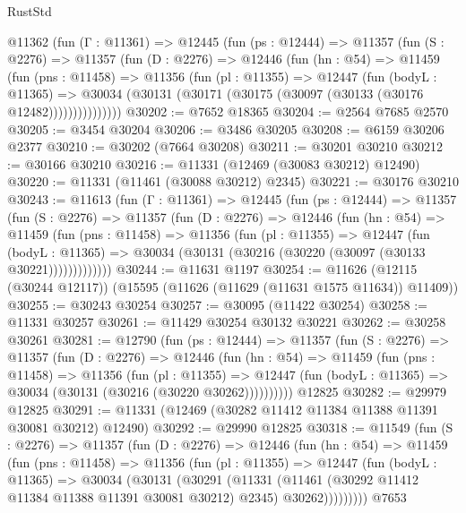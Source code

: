 \begin{lexlean}{RustStd}
\begin{coremodule}
    @11362
      (fun (Γ : @11361) =>
      @12445
        (fun (ps : @12444) =>
        @11357
          (fun (S : @2276) =>
          @11357
            (fun (D : @2276) =>
            @12446
              (fun (hn : @54) =>
              @11459
                (fun (pns : @11458) =>
                @11356
                  (fun (pl : @11355) =>
                  @12447
                    (fun (bodyL : @11365) =>
                    @30034 (@30131 (@30171 (@30175 (@30097 (@30133 (@30176 @12482)))))))))))))))
@30202 := @7652 @18365
@30204 := @2564 @7685 @2570
@30205 := @3454 @30204
@30206 := @3486 @30205
@30208 := @6159 @30206 @2377
@30210 := @30202 (@7664 @30208)
@30211 := @30201 @30210
@30212 := @30166 @30210
@30216 := @11331 (@12469 (@30083 @30212) @12490)
@30220 := @11331 (@11461 (@30088 @30212) @2345)
@30221 := @30176 @30210
@30243 := @11613
    (fun (Γ : @11361) =>
    @12445
      (fun (ps : @12444) =>
      @11357
        (fun (S : @2276) =>
        @11357
          (fun (D : @2276) =>
          @12446
            (fun (hn : @54) =>
            @11459
              (fun (pns : @11458) =>
              @11356
                (fun (pl : @11355) =>
                @12447
                  (fun (bodyL : @11365) =>
                  @30034 (@30131 (@30216 (@30220 (@30097 (@30133 @30221)))))))))))))
@30244 := @11631 @1197
@30254 := @11626 (@12115 (@30244 @12117)) (@15595 (@11626 (@11629 (@11631 @1575 @11634)) @11409))
@30255 := @30243 @30254
@30257 := @30095 (@11422 @30254)
@30258 := @11331 @30257
@30261 := @11429 @30254 @30132 @30221
@30262 := @30258 @30261
@30281 := @12790
    (fun (ps : @12444) =>
    @11357
      (fun (S : @2276) =>
      @11357
        (fun (D : @2276) =>
        @12446
          (fun (hn : @54) =>
          @11459
            (fun (pns : @11458) =>
            @11356
              (fun (pl : @11355) =>
              @12447 (fun (bodyL : @11365) => @30034 (@30131 (@30216 (@30220 @30262))))))))))
    @12825
@30282 := @29979 @12825
@30291 := @11331 (@12469 (@30282 @11412 @11384 @11388 @11391 @30081 @30212) @12490)
@30292 := @29990 @12825
@30318 := @11549
    (fun (S : @2276) =>
    @11357
      (fun (D : @2276) =>
      @12446
        (fun (hn : @54) =>
        @11459
          (fun (pns : @11458) =>
          @11356
            (fun (pl : @11355) =>
            @12447
              (fun (bodyL : @11365) =>
              @30034
                (@30131
                  (@30291
                    (@11331
                      (@11461 (@30292 @11412 @11384 @11388 @11391 @30081 @30212) @2345)
                      @30262)))))))))
    @7653

\end{coremodule}
\end{lexlean}
